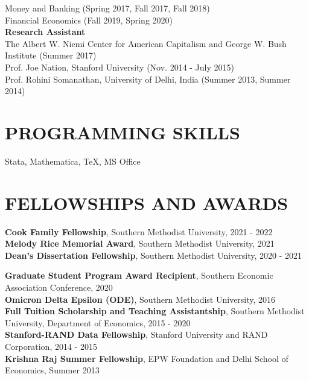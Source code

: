 \documentclass[11pt]{res}
\begin{document}
\begin{resume}
Money and Banking (Spring 2017, Fall 2017, Fall 2018)\vspace{1.5mm}\\
Financial Economics (Fall 2019, Spring 2020)\vspace{1.5mm}\\
{\bf Research Assistant}\vspace{2mm}\\
The Albert W. Niemi Center for American Capitalism and George W. Bush Institute (Summer 2017)\vspace{1.5mm}\\
Prof. Joe Nation, Stanford University (Nov. 2014 - July 2015)\vspace{1.5mm}\\
Prof. Rohini Somanathan, University of Delhi, India (Summer 2013, Summer 2014)


\section{PROGRAMMING SKILLS}\vspace{2mm}
Stata, Mathematica, \TeX, MS Office

\section{FELLOWSHIPS AND AWARDS}\vspace{2mm}
{\bf Cook Family Fellowship}, Southern Methodist University, 2021 - 2022\vspace{1.5mm}\\
{\bf Melody Rice Memorial Award}, Southern Methodist University, 2021\vspace{1.5mm}\\
{\bf Dean's Dissertation Fellowship}, Southern Methodist University, 2020 - 2021


\newpage
\phantom{.}\vspace{.4cm}

{\bf Graduate Student Program Award Recipient}, Southern Economic Association Conference, 2020\vspace{1.5mm}\\
{\bf Omicron Delta Epsilon (ODE)}, Southern Methodist University, 2016\vspace{1.5mm}\\
{\bf Full Tuition Scholarship and Teaching Assistantship}, Southern Methodist University, Department of Economics, 2015 - 2020\vspace{1.5mm}\\
{\bf Stanford-RAND Data Fellowship}, Stanford University and RAND Corporation, 2014 - 2015\vspace{1.5mm}\\
{\bf Krishna Raj Summer Fellowship}, EPW Foundation and Delhi School of Economics, Summer 2013


\end{resume}
\end{document}

